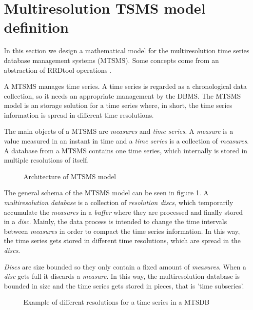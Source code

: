 \section{Multiresolution TSMS model definition}\label{sec:MTSMS}

In this section we design a mathematical model for the multiresolution time series database management systems (MTSMS). Some concepts come from an abstraction of RRDtool operations \parencite{rrdtool}. 

A MTSMS manages time series. A time series is regarded as a chronological data collection, so it needs an appropriate management by the DBMS.
The MTSMS model is an storage solution for a time series where, in short,  the time series information is spread in different time resolutions. 

The main objects of a MTSMS are \emph{measures} and \emph{time series}. A \emph{measure} is a value measured in an instant in time and a  \emph{time series} is a collection of \emph{measures}. A database from a MTSMS contains one time series, which internally is stored in multiple resolutions of itself.

\begin{figure}[tp]
\centering
\setlength{\unitlength}{0.3mm}

\caption{Architecture of MTSMS model}
\label{fig:model:mtsdb}
\end{figure}

The general schema of the MTSMS model can be seen in figure \ref{fig:model:mtsdb}.  A \emph{multiresolution database} is a collection of \emph{resolution discs}, which temporarily accumulate the \emph{measures} in a \emph{buffer} where they are processed and finally stored in a \emph{disc}. Mainly, the data process is intended to change the time intervals between \emph{measures} in order to compact the time series information. In this way, the time series gets stored in different time resolutions, which are spread in the \emph{discs}.

\emph{Discs} are size bounded so they only contain a fixed amount of \emph{measures}. When a \emph{disc} gets full it discards a \emph{measure}. In this way, the multiresolution database is bounded in size and the time series gets stored in pieces, that is 'time subseries'.



\begin{figure}[tp]
\centering

\caption{Example of different resolutions for a time series in a MTSDB}
\label{fig:model:window}
\end{figure}

